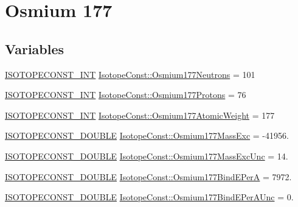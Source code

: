 \hypertarget{group___isotope_const-_osmium-_os177}{}\section{Osmium 177}
\label{group___isotope_const-_osmium-_os177}
\subsection*{Variables}
\begin{DoxyCompactItemize}
\item 
\mbox{\hyperlink{group___isotope_const-_macros_ga5f18360b3e99483a35c32d789e62621c}{I\+S\+O\+T\+O\+P\+E\+C\+O\+N\+S\+T\+\_\+\+I\+NT}} \mbox{\hyperlink{group___isotope_const-_osmium-_os177_ga4c1db425a4b4935093490ad9c26e72ce}{Isotope\+Const\+::\+Osmium177\+Neutrons}} = 101
\item 
\mbox{\hyperlink{group___isotope_const-_macros_ga5f18360b3e99483a35c32d789e62621c}{I\+S\+O\+T\+O\+P\+E\+C\+O\+N\+S\+T\+\_\+\+I\+NT}} \mbox{\hyperlink{group___isotope_const-_osmium-_os177_ga41db970aec1ce56bd716fcc35d547a3b}{Isotope\+Const\+::\+Osmium177\+Protons}} = 76
\item 
\mbox{\hyperlink{group___isotope_const-_macros_ga5f18360b3e99483a35c32d789e62621c}{I\+S\+O\+T\+O\+P\+E\+C\+O\+N\+S\+T\+\_\+\+I\+NT}} \mbox{\hyperlink{group___isotope_const-_osmium-_os177_ga532e8c15fecac1a8176a2f7274732838}{Isotope\+Const\+::\+Osmium177\+Atomic\+Weight}} = 177
\item 
\mbox{\hyperlink{group___isotope_const-_macros_ga8f45a7272ce02c0b4c65c44636ed719a}{I\+S\+O\+T\+O\+P\+E\+C\+O\+N\+S\+T\+\_\+\+D\+O\+U\+B\+LE}} \mbox{\hyperlink{group___isotope_const-_osmium-_os177_ga910a5c034acf7bba16fda41ab2665b0c}{Isotope\+Const\+::\+Osmium177\+Mass\+Exc}} = -\/41956.
\item 
\mbox{\hyperlink{group___isotope_const-_macros_ga8f45a7272ce02c0b4c65c44636ed719a}{I\+S\+O\+T\+O\+P\+E\+C\+O\+N\+S\+T\+\_\+\+D\+O\+U\+B\+LE}} \mbox{\hyperlink{group___isotope_const-_osmium-_os177_ga79d2658e4f71ed1578d8eb3d15bd2144}{Isotope\+Const\+::\+Osmium177\+Mass\+Exc\+Unc}} = 14.
\item 
\mbox{\hyperlink{group___isotope_const-_macros_ga8f45a7272ce02c0b4c65c44636ed719a}{I\+S\+O\+T\+O\+P\+E\+C\+O\+N\+S\+T\+\_\+\+D\+O\+U\+B\+LE}} \mbox{\hyperlink{group___isotope_const-_osmium-_os177_gad3af3e6f8c35772caeb9384e4e145bd0}{Isotope\+Const\+::\+Osmium177\+Bind\+E\+PerA}} = 7972.
\item 
\mbox{\hyperlink{group___isotope_const-_macros_ga8f45a7272ce02c0b4c65c44636ed719a}{I\+S\+O\+T\+O\+P\+E\+C\+O\+N\+S\+T\+\_\+\+D\+O\+U\+B\+LE}} \mbox{\hyperlink{group___isotope_const-_osmium-_os177_ga80e8d357e3fdf0b5c183c6fb1ce7be5f}{Isotope\+Const\+::\+Osmium177\+Bind\+E\+Per\+A\+Unc}} = 0.

\end{DoxyCompactItemize}
